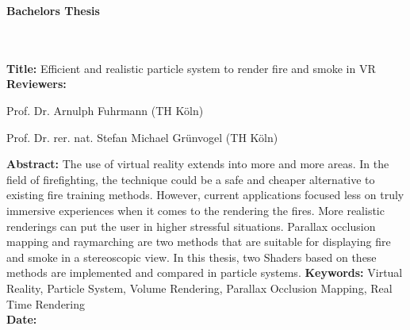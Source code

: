 \begin{flushleft}
    \begin{huge}
        \textbf{Bachelors Thesis}
    \end{huge}
    ~\\
    ~\\
    \textbf{Title:} Efficient and realistic particle system to render fire and smoke in VR
    ~\\
    \doublespacing
    \textbf{Reviewers:}
    \begin{description}
        \vspace{-0.2cm}
        \itemsep-8pt
        \item[–]
            Prof. Dr. Arnulph Fuhrmann (TH Köln)
        \item[–]
            Prof. Dr. rer. nat. Stefan Michael Grünvogel (TH Köln)
    \end{description}
    \vspace{-0.5cm}
    \singlespacing
    \textbf{Abstract:}
    The use of virtual reality extends into more and more areas.
    In the field of firefighting, the technique could be a safe and cheaper 
    alternative to existing fire training methods. 
    However, current applications focused less on truly immersive experiences when it 
    comes to the rendering the fires. More realistic renderings can put the user in higher
    stressful situations. 
    Parallax occlusion mapping and raymarching are two methods that are suitable 
    for displaying fire and smoke in a stereoscopic view. In this thesis, two Shaders based on these 
    methods are implemented and compared in particle systems.
    \singlespacing
    \textbf{Keywords:} Virtual Reality, Particle System, Volume Rendering, Parallax Occlusion Mapping, Real Time Rendering\\
    \doublespacing
    \textbf{Date:}
\end{flushleft}

